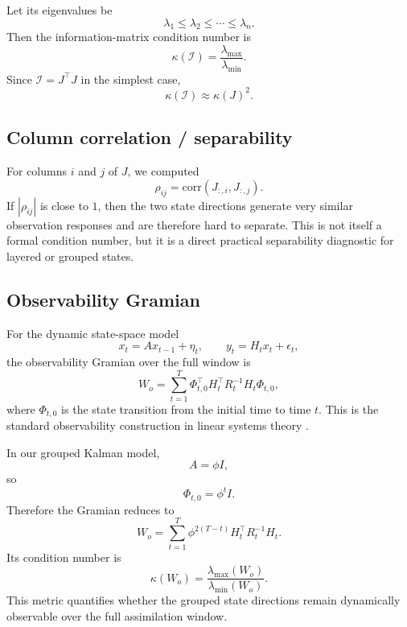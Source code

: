 \documentclass[11pt]{article}
\begin{document}
Let its eigenvalues be
\begin{equation}
\lambda_1 \le \lambda_2 \le \cdots \le \lambda_n.
\end{equation}
Then the information-matrix condition number is
\begin{equation}
\kappa(\mathcal{I})
=
\frac{\lambda_{\max}}{\lambda_{\min}}.
\end{equation}
Since $\mathcal{I}=J^\top J$ in the simplest case,
\begin{equation}
\kappa(\mathcal{I}) \approx \kappa(J)^2.
\end{equation}

\subsection{Column correlation / separability}

For columns $i$ and $j$ of $J$, we computed
\begin{equation}
\rho_{ij}
=
\mathrm{corr}(J_{:,i}, J_{:,j}).
\end{equation}
If $|\rho_{ij}|$ is close to $1$, then the two state directions generate very similar observation responses and are therefore hard to separate. This is not itself a formal condition number, but it is a direct practical separability diagnostic for layered or grouped states.

\subsection{Observability Gramian}

For the dynamic state-space model
\begin{equation}
x_t = A x_{t-1} + \eta_t,
\qquad
y_t = H_t x_t + \epsilon_t,
\end{equation}
the observability Gramian over the full window is
\begin{equation}
W_o
=
\sum_{t=1}^{T}
\Phi_{t,0}^\top H_t^\top R_t^{-1} H_t \Phi_{t,0},
\end{equation}
where $\Phi_{t,0}$ is the state transition from the initial time to time $t$. This is the standard observability construction in linear systems theory \cite{kalman1960general}.

In our grouped Kalman model,
\begin{equation}
A = \phi I,
\end{equation}
so
\begin{equation}
\Phi_{t,0} = \phi^t I.
\end{equation}
Therefore the Gramian reduces to
\begin{equation}
W_o
=
\sum_{t=1}^{T}
\phi^{2(T-t)} H_t^\top R_t^{-1} H_t.
\end{equation}
Its condition number is
\begin{equation}
\kappa(W_o)
=
\frac{\lambda_{\max}(W_o)}{\lambda_{\min}(W_o)}.
\end{equation}
This metric quantifies whether the grouped state directions remain dynamically observable over the full assimilation window.
\end{document}
